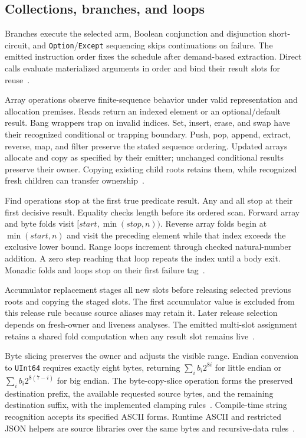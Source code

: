 \documentclass[11pt]{article}
\newcommand{\code}[1]{\texttt{#1}}
\begin{document}
\subsection{Collections, branches, and loops}

Branches execute the selected arm, Boolean conjunction and disjunction short-circuit, and \code{Option}/\code{Except} sequencing skips continuations on failure.  The emitted instruction order fixes the schedule after demand-based extraction.  Direct calls evaluate materialized arguments in order and bind their result slots for reuse~\cite{extract,binary}.

Array operations observe finite-sequence behavior under valid representation and allocation premises.  Reads return an indexed element or an optional/default result.  Bang wrappers trap on invalid indices.  Set, insert, erase, and swap have their recognized conditional or trapping boundary.  Push, pop, append, extract, reverse, map, and filter preserve the stated sequence ordering.  Updated arrays allocate and copy as specified by their emitter; unchanged conditional results preserve their owner.  Copying existing child roots retains them, while recognized fresh children can transfer ownership~\cite{values,binary}.

Find operations stop at the first true predicate result.  Any and all stop at their first decisive result.  Equality checks length before its ordered scan.  Forward array and byte folds visit $[\mathit{start},\min(\mathit{stop},n))$.  Reverse array folds begin at $\min(\mathit{start},n)$ and visit the preceding element while that index exceeds the exclusive lower bound.  Range loops increment through checked natural-number addition.  A zero step reaching that loop repeats the index until a body exit.  Monadic folds and loops stop on their first failure tag~\cite{binary}.

Accumulator replacement stages all new slots before releasing selected previous roots and copying the staged slots.  The first accumulator value is excluded from this release rule because source aliases may retain it.  Later release selection depends on fresh-owner and liveness analyses.  The emitted multi-slot assignment retains a shared fold computation when any result slot remains live~\cite{values,binary}.

Byte slicing preserves the owner and adjusts the visible range.  Endian conversion to \code{UInt64} requires exactly eight bytes, returning $\sum_i b_i2^{8i}$ for little endian or $\sum_i b_i2^{8(7-i)}$ for big endian.  The byte-copy-slice operation forms the preserved destination prefix, the available requested source bytes, and the remaining destination suffix, with the implemented clamping rules~\cite{values,binary}.  Compile-time string recognition accepts its specified ASCII forms.  Runtime ASCII and restricted JSON helpers are source libraries over the same bytes and recursive-data rules~\cite{specification}.
\end{document}
